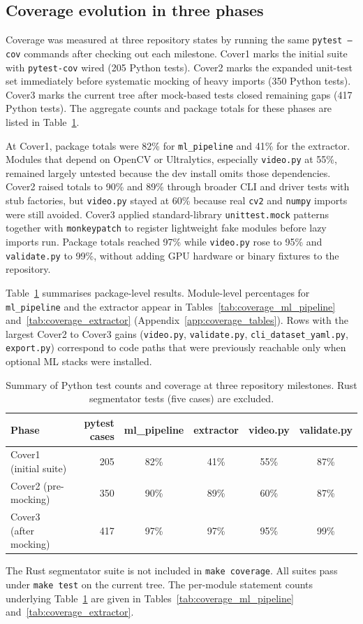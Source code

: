 \subsection{Coverage evolution in three phases}

Coverage was measured at three repository states by running the same \texttt{pytest --cov} commands after checking out each milestone. Cover1 marks the initial suite with \texttt{pytest-cov} wired (205 Python tests). Cover2 marks the expanded unit-test set immediately before systematic mocking of heavy imports (350 Python tests). Cover3 marks the current tree after mock-based tests closed remaining gaps (417 Python tests). The aggregate counts and package totals for these phases are listed in Table~\ref{tab:coverage_summary}.

At Cover1, package totals were 82\% for \texttt{ml\_pipeline} and 41\% for the extractor. Modules that depend on OpenCV or Ultralytics, especially \texttt{video.py} at 55\%, remained largely untested because the dev install omits those dependencies. Cover2 raised totals to 90\% and 89\% through broader CLI and driver tests with stub factories, but \texttt{video.py} stayed at 60\% because real \texttt{cv2} and \texttt{numpy} imports were still avoided. Cover3 applied standard-library \texttt{unittest.mock} patterns together with \texttt{monkeypatch} to register lightweight fake modules before lazy imports run. Package totals reached 97\% while \texttt{video.py} rose to 95\% and \texttt{validate.py} to 99\%, without adding GPU hardware or binary fixtures to the repository.

Table~\ref{tab:coverage_summary} summarises package-level results. Module-level percentages for \texttt{ml\_pipeline} and the extractor appear in Tables~\ref{tab:coverage_ml_pipeline} and~\ref{tab:coverage_extractor} (Appendix~\ref{app:coverage_tables}). Rows with the largest Cover2 to Cover3 gains (\texttt{video.py}, \texttt{validate.py}, \texttt{cli\_dataset\_yaml.py}, \texttt{export.py}) correspond to code paths that were previously reachable only when optional ML stacks were installed.

\begin{table}[htbp]
\centering
\footnotesize
\begin{tabular}{@{}l r c c c c@{}}
\hline
\textbf{Phase} & \textbf{pytest cases} & \textbf{ml\_pipeline} & \textbf{extractor} & \textbf{video.py} & \textbf{validate.py} \\
\hline
Cover1 (initial suite) & 205 & 82\% & 41\% & 55\% & 87\% \\
Cover2 (pre-mocking) & 350 & 90\% & 89\% & 60\% & 87\% \\
Cover3 (after mocking) & 417 & 97\% & 97\% & 95\% & 99\% \\
\hline
\end{tabular}
\caption{Summary of Python test counts and coverage at three repository milestones. Rust segmentator tests (five cases) are excluded.}
\label{tab:coverage_summary}
\end{table}

The Rust segmentator suite is not included in \texttt{make coverage}. All suites pass under \texttt{make test} on the current tree. The per-module statement counts underlying Table~\ref{tab:coverage_summary} are given in Tables~\ref{tab:coverage_ml_pipeline} and~\ref{tab:coverage_extractor}.
